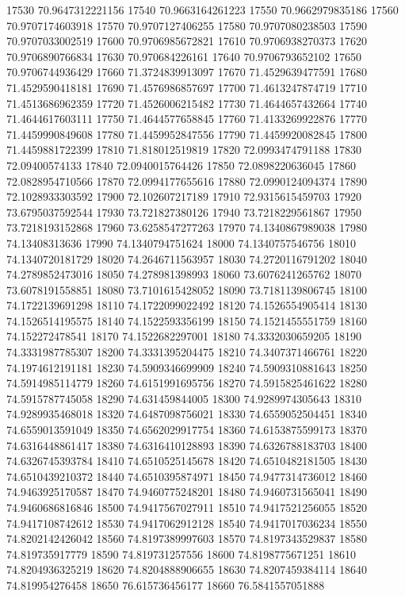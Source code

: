 {17530 70.9647312221156
17540 70.9663164261223
17550 70.9662979835186
17560 70.9707174603918
17570 70.9707127406255
17580 70.9707080238503
17590 70.9707033002519
17600 70.9706985672821
17610 70.9706938270373
17620 70.9706890766834
17630 70.970684226161
17640 70.9706793652102
17650 70.9706744936429
17660 71.3724839913097
17670 71.4529639477591
17680 71.4529590418181
17690 71.4576986857697
17700 71.4613247874719
17710 71.4513686962359
17720 71.4526006215482
17730 71.4644657432664
17740 71.4644617603111
17750 71.4644577658845
17760 71.4133269922876
17770 71.4459990849608
17780 71.4459952847556
17790 71.4459920082845
17800 71.4459881722399
17810 71.818012519819
17820 72.0993474791188
17830 72.09400574133
17840 72.0940015764426
17850 72.0898220636045
17860 72.0828954710566
17870 72.0994177655616
17880 72.0990124094374
17890 72.1028933303592
17900 72.102607217189
17910 72.9315615459703
17920 73.6795037592544
17930 73.721827380126
17940 73.7218229561867
17950 73.7218193152868
17960 73.6258547277263
17970 74.1340867989038
17980 74.13408313636
17990 74.1340794751624
18000 74.1340757546756
18010 74.1340720181729
18020 74.2646711563957
18030 74.2720116791202
18040 74.2789852473016
18050 74.278981398993
18060 73.6076241265762
18070 73.6078191558851
18080 73.7101615428052
18090 73.7181139806745
18100 74.1722139691298
18110 74.1722099022492
18120 74.1526554905414
18130 74.1526514195575
18140 74.1522593356199
18150 74.1521455551759
18160 74.152272478541
18170 74.1522682297001
18180 74.3332030659205
18190 74.3331987785307
18200 74.3331395204475
18210 74.3407371466761
18220 74.1974612191181
18230 74.5909346699909
18240 74.5909310881643
18250 74.5914985114779
18260 74.6151991695756
18270 74.5915825461622
18280 74.5915787745058
18290 74.631459844005
18300 74.9289974305643
18310 74.9289935468018
18320 74.6487098756021
18330 74.6559052504451
18340 74.6559013591049
18350 74.6562029917754
18360 74.6153875599173
18370 74.6316448861417
18380 74.6316410128893
18390 74.6326788183703
18400 74.6326745393784
18410 74.6510525145678
18420 74.6510482181505
18430 74.6510439210372
18440 74.6510395874971
18450 74.9477314736012
18460 74.9463925170587
18470 74.9460775248201
18480 74.9460731565041
18490 74.9460686816846
18500 74.9417567027911
18510 74.9417521256055
18520 74.9417108742612
18530 74.9417062912128
18540 74.9417017036234
18550 74.8202142426042
18560 74.8197389997603
18570 74.8197343529837
18580 74.819735917779
18590 74.819731257556
18600 74.8198775671251
18610 74.8204936325219
18620 74.8204888906655
18630 74.8207459384114
18640 74.819954276458
18650 76.615736456177
18660 76.5841557051888
}
